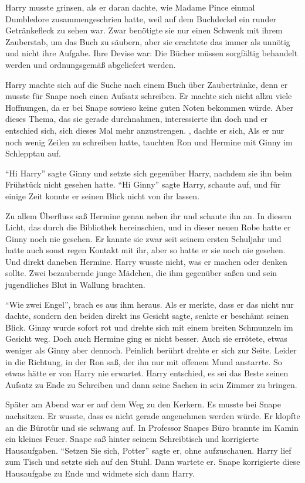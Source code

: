 Harry musste grinsen, als er daran dachte, wie Madame Pince einmal Dumbledore zusammengeschrien hatte, weil auf dem Buchdeckel ein runder Getränkefleck zu sehen war. Zwar benötigte sie nur einen Schwenk mit ihrem Zauberstab, um das Buch zu säubern, aber sie erachtete das immer als unnötig und nicht ihre Aufgabe. Ihre Devise war: Die Bücher müssen sorgfältig behandelt werden und ordnungsgemäß abgeliefert werden.

Harry machte sich auf die Suche nach einem Buch über Zaubertränke, denn er musste für Snape noch einen Aufsatz schreiben. Er machte sich nicht allzu viele Hoffnungen, da er bei Snape sowieso keine guten Noten bekommen würde. Aber dieses Thema, das sie gerade durchnahmen, interessierte ihn doch und er entschied sich, sich dieses Mal mehr anzustrengen. , dachte er sich,  Als er nur noch wenig Zeilen zu schreiben hatte, tauchten Ron und Hermine mit Ginny im Schlepptau auf.

\enquote{Hi Harry} sagte Ginny und setzte sich gegenüber Harry, nachdem sie ihn beim Frühstück nicht gesehen hatte. \enquote{Hi Ginny} sagte Harry, schaute auf, und für einige Zeit konnte er seinen Blick nicht von ihr lassen.

Zu allem Überfluss saß Hermine genau neben ihr und schaute ihn an. In diesem Licht, das durch die Bibliothek hereinschien, und in dieser neuen Robe hatte er Ginny noch nie gesehen. Er kannte sie zwar seit seinem ersten Schuljahr und hatte auch sonst regen Kontakt mit ihr, aber so hatte er sie noch nie gesehen. Und direkt daneben Hermine. Harry wusste nicht, was er machen oder denken sollte. Zwei bezaubernde junge Mädchen, die ihm gegenüber saßen und sein jugendliches Blut in Wallung brachten.

\enquote{Wie zwei Engel}, brach es aus ihm heraus. Als er merkte, dass er das nicht nur dachte, sondern den beiden direkt ins Gesicht sagte, senkte er beschämt seinen Blick. Ginny wurde sofort rot und drehte sich mit einem breiten Schmunzeln im Gesicht weg. Doch auch Hermine ging es nicht besser. Auch sie errötete, etwas weniger als Ginny aber dennoch. Peinlich berührt drehte er sich zur Seite. Leider in die Richtung, in der Ron saß, der ihn nur mit offenem Mund anstarrte. So etwas hätte er von Harry nie erwartet. Harry entschied, es sei das Beste seinen Aufsatz zu Ende zu Schreiben und dann seine Sachen in sein Zimmer zu bringen.

Später am Abend war er auf dem Weg zu den Kerkern. Es musste bei Snape nachsitzen. Er wusste, dass es nicht gerade angenehmen werden würde. Er klopfte an die Bürotür und sie schwang auf. In Professor Snapes Büro brannte im Kamin ein kleines Feuer. Snape saß hinter seinem Schreibtisch und korrigierte Hausaufgaben. \enquote{Setzen Sie sich, Potter} sagte er, ohne aufzuschauen. Harry lief zum Tisch und setzte sich auf den Stuhl. Dann wartete er. Snape korrigierte diese Hausaufgabe zu Ende und widmete sich dann Harry.


